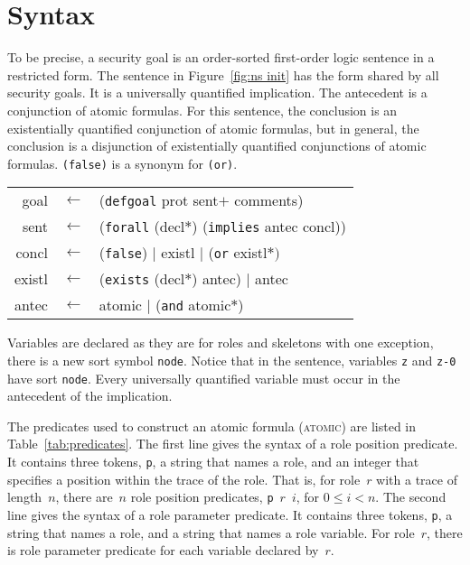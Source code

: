 \documentclass[12pt]{article}
\newcommand{\sym}[1]{\textup{\texttt{#1}}}
\begin{document}
\section{Syntax}\label{sec:syntax}

To be precise, a security goal is an order-sorted first-order logic
sentence in a restricted form.  The sentence in Figure~\ref{fig:ns
  init} has the form shared by all security goals.  It is a universally
quantified implication.  The antecedent is a conjunction of atomic
formulas.  For this sentence, the conclusion is an existentially
quantified conjunction of atomic formulas, but in general, the
conclusion is a disjunction of existentially quantified conjunctions
of atomic formulas.  \sym{(false)} is a synonym for \sym{(or)}.

\begin{center}\scshape
  \begin{tabular}{rcl}
  goal&$\leftarrow$&(\sym{defgoal} prot sent$+$ comments)
  \\ sent&$\leftarrow$&(\sym{forall} (decl$\ast$) (\sym{implies} antec concl))
  \\ concl&$\leftarrow$&(\sym{false})
  $\mid$ existl $\mid$ (\sym{or} existl$\ast)$
  \\ existl&$\leftarrow$&(\sym{exists}
  (decl$\ast$) antec) $\mid$ antec
  \\ antec&$\leftarrow$&atomic $\mid$ (\sym{and} atomic$\ast$)
  \end{tabular}
\end{center}

Variables are declared as they are for roles and skeletons with one
exception, there is a new sort symbol \sym{node}.  Notice that in the
sentence, variables \sym{z} and \sym{z-0} have sort \sym{node}.  Every
universally quantified variable must occur in the antecedent of the
implication.

The predicates used to construct an atomic formula (\textsc{atomic})
are listed in Table~\ref{tab:predicates}.  The first line gives the
syntax of a role position predicate.  It contains three tokens,
\texttt{p}, a string that names a role, and an integer that specifies
a position within the trace of the role.  That is, for role~$r$ with a
trace of length~$n$, there are~$n$ role position predicates,
\mbox{\texttt{p} $r$ $i$}, for $0\leq i < n$.  The second line gives
the syntax of a role parameter predicate.  It contains three tokens,
\texttt{p}, a string that names a role, and a string that names a role
variable.  For role~$r$, there is role parameter predicate for each
variable declared by~$r$.
\end{document}
